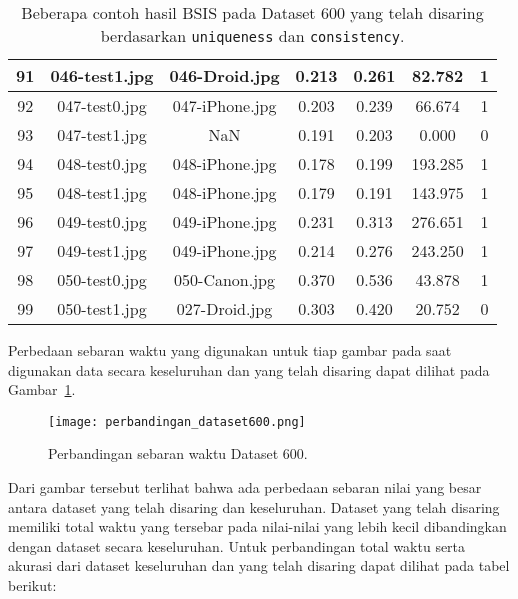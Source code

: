 \begin{table}[H]
\begin{tabular}{|c|c|c|c|c|c|c|}
		\hline
		91  & 046-test1.jpg    & 046-Droid.jpg    & 0.213                 & 0.261                & 82.782                 & 1                  \\ 
		\hline
		92  & 047-test0.jpg    & 047-iPhone.jpg   & 0.203                 & 0.239                & 66.674                 & 1                  \\ 
		\hline
		93  & 047-test1.jpg    & NaN              & 0.191                 & 0.203                & 0.000                  & 0                  \\ 
		\hline
		94  & 048-test0.jpg    & 048-iPhone.jpg   & 0.178                 & 0.199                & 193.285                & 1                  \\ 
		\hline
		95  & 048-test1.jpg    & 048-iPhone.jpg   & 0.179                 & 0.191                & 143.975                & 1                  \\ 
		\hline
		96  & 049-test0.jpg    & 049-iPhone.jpg   & 0.231                 & 0.313                & 276.651                & 1                  \\ 
		\hline
		97  & 049-test1.jpg    & 049-iPhone.jpg   & 0.214                 & 0.276                & 243.250                & 1                  \\ 
		\hline
		98  & 050-test0.jpg    & 050-Canon.jpg    & 0.370                 & 0.536                & 43.878                 & 1                  \\ 
		\hline
		99  & 050-test1.jpg    & 027-Droid.jpg    & 0.303                 & 0.420                & 20.752                 & 0                  \\
		\hline
	\end{tabular}
	\caption{Beberapa contoh hasil BSIS pada Dataset 600 yang telah disaring berdasarkan \texttt{uniqueness} dan \texttt{consistency}.}
	\label{tab:result_filtered_600}
\end{table}

Perbedaan sebaran waktu yang digunakan untuk tiap gambar pada saat digunakan data secara keseluruhan dan yang telah disaring dapat dilihat pada Gambar~\ref{fig:perbandingan_dataset600}.
\begin{figure}[H]
	\centering
	\texttt{[image: perbandingan\_dataset600.png]}
	\caption{Perbandingan sebaran waktu Dataset 600.}
	\label{fig:perbandingan_dataset600}
\end{figure}
Dari gambar tersebut terlihat bahwa ada perbedaan sebaran nilai yang besar antara dataset yang telah disaring dan keseluruhan. Dataset yang telah disaring memiliki total waktu yang tersebar pada nilai-nilai yang lebih kecil dibandingkan dengan dataset secara keseluruhan. Untuk perbandingan total waktu serta akurasi dari dataset keseluruhan dan yang telah disaring dapat dilihat pada tabel berikut:

